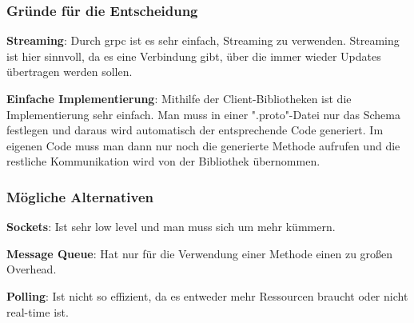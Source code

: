 \subsubsection{Gründe für die Entscheidung}\label{subsubsec:grunde-fur-die-entscheidung-01}

\textbf{Streaming}: Durch grpc ist es sehr einfach, Streaming zu verwenden.
Streaming ist hier sinnvoll, da es eine Verbindung gibt, über die immer wieder Updates übertragen werden sollen.

\textbf{Einfache Implementierung}: Mithilfe der Client-Bibliotheken ist die Implementierung sehr einfach.
Man muss in einer ".proto"-Datei nur das Schema festlegen und daraus wird automatisch der entsprechende Code generiert.
Im eigenen Code muss man dann nur noch die generierte Methode aufrufen und die restliche Kommunikation wird von der Bibliothek übernommen.

\subsubsection{Mögliche Alternativen}\label{subsubsec:mogliche-alternativen-01}

\textbf{Sockets}: Ist sehr low level und man muss sich um mehr kümmern.

\textbf{Message Queue}: Hat nur für die Verwendung einer Methode einen zu großen Overhead.

\textbf{Polling}: Ist nicht so effizient, da es entweder mehr Ressourcen braucht oder nicht real-time ist.